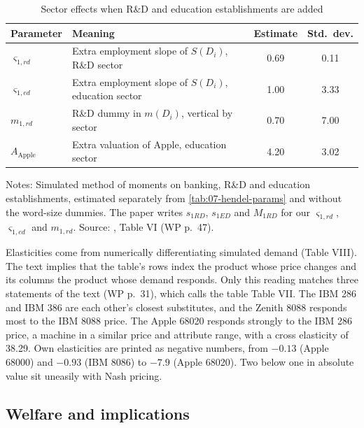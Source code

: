 \begin{table}[htbp]
\centering
\caption{Sector effects when R\&D and education establishments are added \citep[Table VI]{Hendel1994}}
\label{tab:07-hendel-sectors}
\small
\begin{tabular}{llcc}
\toprule
Parameter & Meaning & Estimate & Std.\ dev. \\
\midrule
$\varsigma_{1,rd}$ & Extra employment slope of $S(D_i)$, R\&D sector & 0.69 & 0.11 \\
$\varsigma_{1,ed}$ & Extra employment slope of $S(D_i)$, education sector & 1.00 & 3.33 \\
$m_{1,rd}$ & R\&D dummy in $m(D_i)$, vertical by sector & 0.70 & 7.00 \\
$A_{\text{Apple}}$ & Extra valuation of Apple, education sector & 4.20 & 3.02 \\
\bottomrule
\end{tabular}
\par\medskip
\parbox{\linewidth}{\footnotesize Notes: Simulated method of moments on banking, R\&D and education
establishments, estimated separately from \cref{tab:07-hendel-params} and without the word-size dummies. The paper
writes $s_{1RD}$, $s_{1ED}$ and $M_{1RD}$ for our $\varsigma_{1,rd}$, $\varsigma_{1,ed}$ and $m_{1,rd}$.
Source: \citet{Hendel1994}, Table VI (WP p.~47).}
\end{table}

Elasticities come from numerically differentiating simulated demand (Table VIII). The text implies that the
table's rows index the product whose price changes and its columns the product whose demand responds. Only this
reading matches three statements of the text (WP p.~31), which calls the table Table VII. The IBM 286 and IBM 386 are
each other's closest substitutes, and the Zenith 8088 responds most to the IBM 8088 price. The Apple 68020 responds
strongly to the IBM 286 price, a machine in a similar price and attribute range, with a cross elasticity of 38.29.
Own elasticities are printed as negative numbers, from
$-0.13$ (Apple 68000) and $-0.93$ (IBM 8086) to $-7.9$ (Apple 68020). Two below one in absolute value sit uneasily
with Nash pricing.

\subsection{Welfare and implications}\label{sec:07-hendel-welfare}

